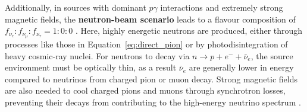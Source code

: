 Additionally, in sources with dominant $p\gamma$ interactions and extremely strong magnetic fields, the \textbf{neutron-beam scenario} leads to a flavour composition of $f_{\nu_e} : f_{\nu_\mu} : f_{\nu_\tau} = 1 : 0 : 0$ \cite{flavour1}. Here, highly energetic neutrons are produced, either through processes like those in Equation~\ref{eq:direct_pion} or by photodisintegration of heavy cosmic-ray nuclei. For neutrons to decay via $n \rightarrow p + e^- + \bar{\nu}_e$, the source environment must be optically thin, as a result $\bar{\nu}_e$ are generally lower in energy compared to neutrinos from charged pion or muon decay. Strong magnetic fields are also needed to cool charged pions and muons through synchrotron losses, preventing their decays from contributing to the high-energy neutrino spectrum .

